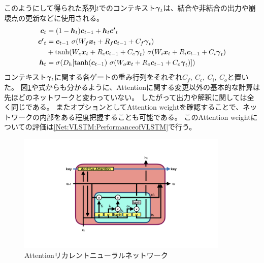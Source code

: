 このようにして得られた系列$t$でのコンテキスト${\mbox{\boldmath{$\gamma$}}}_{t}$は、結合や非結合の出力や崩壊点の更新などに使用される。
\begin{equation}
 \begin{split}
  {\mbox{\boldmath{$c$}}}_{t} 
  &= (1-{\mbox{\boldmath{$h$}}}_t) {\mbox{\boldmath{$c$}}}_{t-1} + {\mbox{\boldmath{$h$}}}_t {\mbox{\boldmath{$c'$}}}_{t}\\
  {\mbox{\boldmath{$c'$}}}_{t}
  &= {\mbox{\boldmath{$c$}}}_{t-1} \  \sigma (W_f {\mbox{\boldmath{$x$}}}_t + R_f {\mbox{\boldmath{$c$}}}_{t-1} + C_f {\mbox{\boldmath{$\gamma$}}}_{t})\\
  &+ \tanh (W_c {\mbox{\boldmath{$x$}}}_t + R_c {\mbox{\boldmath{$c$}}}_{t-1} + C_c {\mbox{\boldmath{$\gamma$}}}_{t}) \  \sigma (W_i {\mbox{\boldmath{$x$}}}_t + R_i {\mbox{\boldmath{$c$}}}_{t-1} + C_i {\mbox{\boldmath{$\gamma$}}}_{t})\\
  {\mbox{\boldmath{$h$}}}_{t} 
  &= \sigma (D_h [\tanh({\mbox{\boldmath{$c$}}}_{t-1}) \  \sigma (W_o {\mbox{\boldmath{$x$}}}_t + R_o {\mbox{\boldmath{$c$}}}_{t-1} + C_o {\mbox{\boldmath{$\gamma$}}}_{t}) ])
 \end{split}
\end{equation}
コンテキスト${\mbox{\boldmath{$\gamma$}}}_{t}$に関する各ゲートの重み行列をそれぞれ$C_f,\ C_c,\ C_i,\ C_o$と置いた。
図\ref{3-4-2-2AttentionVLSTM}や式からも分かるように、Attentionに関する変更以外の基本的な計算は先ほどのネットワークと変わっていない。
したがって出力や解釈に関しては全く同じである。
またオプションとしてAttention weightを確認することで、ネットワークの内部をある程度把握することも可能である。
このAttention weightについての評価は\ref{Net:VLSTM:PerformanceofVLSTM}で行う。

\begin{figure}[htbp]
 \centering
 \includegraphics[trim = 100 100 100 50, width=0.9\textwidth]{Figure/3Networks/3-4-2-2AttentionVLSTM.png}
 \caption{Attentionリカレントニューラルネットワーク}
 \label{3-4-2-2AttentionVLSTM}
\end{figure}


